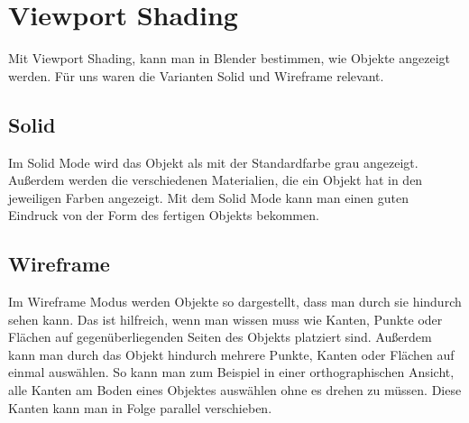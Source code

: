 \section{Viewport Shading}
Mit Viewport Shading, kann man in Blender bestimmen, wie Objekte angezeigt werden. Für uns waren die Varianten Solid und Wireframe relevant.

\subsection{Solid}
Im Solid Mode wird das Objekt als mit der Standardfarbe grau angezeigt.\citep{viewportshading:link} Außerdem werden die verschiedenen Materialien, die ein Objekt
hat in den jeweiligen Farben angezeigt. Mit dem Solid Mode kann man einen guten Eindruck von der Form des fertigen Objekts bekommen.

\subsection{Wireframe}
Im Wireframe Modus werden Objekte so dargestellt, dass man durch sie hindurch sehen kann.\citep{viewportshading:link}
Das ist hilfreich, wenn man wissen muss wie Kanten, Punkte oder Flächen auf gegenüberliegenden Seiten des Objekts
platziert sind. Außerdem kann man durch das Objekt hindurch mehrere Punkte, Kanten oder Flächen auf einmal auswählen. So kann man zum Beispiel
in einer orthographischen Ansicht, alle Kanten am Boden eines Objektes auswählen ohne es drehen zu müssen. Diese Kanten kann
man in Folge parallel verschieben.
